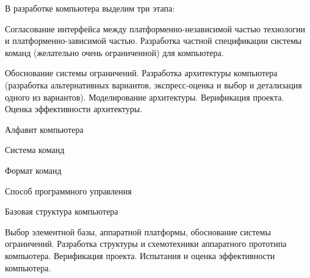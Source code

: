 В разработке компьютера выделим три этапа:
\begin{textitemize}
	\item Согласование интерфейса между платформенно-независимой частью технологии и платформенно-зависимой частью. Разработка частной спецификации системы команд (желательно очень ограниченной) для компьютера.
	\item Обоснование системы ограничений. Разработка архитектуры компьютера (разработка альтернативных вариантов, экспресс-оценка и выбор и детализация одного из вариантов). Моделирование архитектуры. Верификация проекта. Оценка эффективности архитектуры.
	\begin{textitemize}%
		\item Алфавит компьютера
		\item Система команд
		\item Формат команд
		\item Способ программного управления		
		\item Базовая структура компьютера
	\end{textitemize}
	\item Выбор элементной базы, аппаратной платформы, обоснование системы ограничений. Разработка структуры и схемотехники аппаратного прототипа компьютера. Верификация проекта. Испытания и оценка эффективности компьютера.
\end{textitemize}

